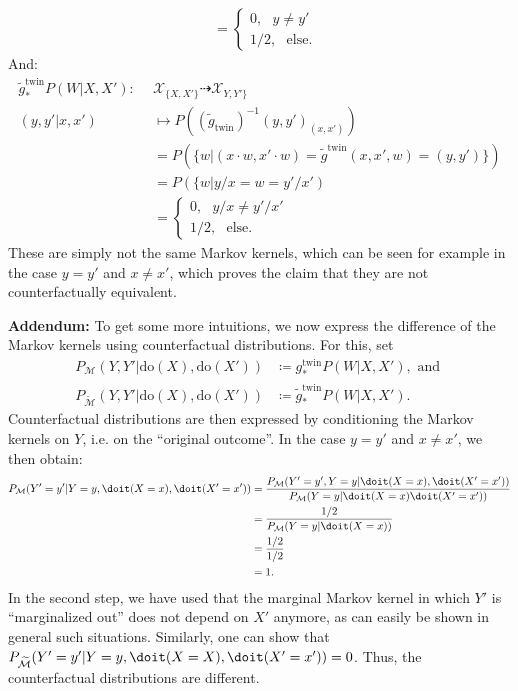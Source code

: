 \begin{gradedsolution}
\begin{enumerate}
\begin{align*}
	    & = \begin{cases} 0, \ \ \ y \neq y' \\ 1/2, \ \ \ \text{else}.\end{cases}
	\end{align*}
	And:
	\begin{align*}
	\widetilde{g}^{\text{twin}}_* P(W | X, X'): \ \  & \mathcal{X}_{\{X,X'\}} \dashrightarrow \mathcal{X}_{Y,Y'\}} \\
	 (y, y' | x, x') & \mapsto P\left((\widetilde{g}_{\text{twin}})^{-1}(y,y')_{(x,x')}\right) \\
	 & = P\left(\{w | (x \cdot w, x' \cdot w) = \widetilde{g}^{\text{twin}}(x, x', w) = (y, y')\}\right) \\
	  & = P\left(\{w | y/x = w = y'/x'\right) \\
	    & = \begin{cases} 0, \ \ \ y/x \neq y'/x' \\ 1/2, \ \ \ \text{else}.\end{cases}
	\end{align*}
	These are simply not the same Markov kernels, which can be seen for example in the case $y = y'$ and $x \neq x'$, which proves the claim that they are not counterfactually equivalent.

	\textbf{Addendum:} To get some more intuitions, we now express the difference of the Markov kernels using counterfactual distributions.
	For this, set 
	\begin{align*}
	  P_{\mathcal{M}}(Y, Y' | \text{do}(X), \text{do}(X')) & \coloneq g_{*}^{\text{twin}}P(W | X, X'), \text{ and } \\
	  P_{\widetilde{\mathcal{M}}}(Y, Y' | \text{do}(X), \text{do}(X')) & \coloneq  \widetilde{g}_*^{\text{twin}}P(W | X, X').
	\end{align*}
	Counterfactual distributions are then expressed by conditioning the Markov kernels on $Y$, i.e. on the ``original outcome''.
	In the case $y = y'$ and $x \neq x'$, we then obtain:
	\begin{align*}
	  P_{\mathcal{M}}(Y' = y' | Y = y, \doit(X = x), \doit(X' = x')) & = \frac{P_{\mathcal{M}}(Y' = y', Y = y | \doit(X = x), \doit(X' = x'))}{P_{\mathcal{M}}(Y = y | \doit(X = x) \doit(X ' = x'))} \\
	  & = \frac{1/2}{P_{\mathcal{M}}(Y = y | \doit(X = x))} \\
	  & = \frac{1/2}{1/2} \\
	  & = 1.
	\end{align*}
	In the second step, we have used that the marginal Markov kernel in which $Y'$ is ``marginalized out'' does not depend on $X'$ anymore, as can easily be shown in general such situations. 
	Similarly, one can show that $P_{\widetilde{\mathcal{M}}}(Y' = y' | Y = y, \doit(X = X), \doit(X' = x')) = 0$.
	Thus, the counterfactual distributions are different.


\end{enumerate}
\end{gradedsolution}
